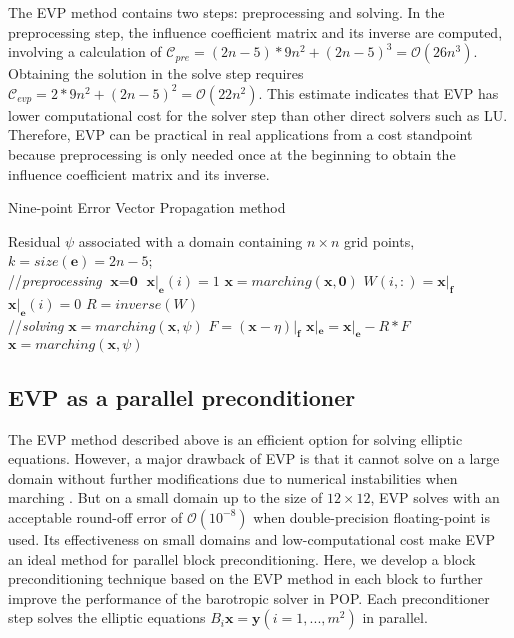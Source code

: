 The EVP method contains two steps: preprocessing and solving. In
the preprocessing step, the influence coefficient matrix and its
inverse are computed, involving a calculation of $\mathcal{C}_{pre}=
(2n-5)* 9n^2 + (2n-5)^3 = \mathcal {O} (26n^3)$.  Obtaining the solution in the solve step requires
$\mathcal{C}_{evp}= 2* 9n^2 + (2n-5)^2 = \mathcal{O} (22n^2)$.  This
estimate indicates that EVP has lower
computational cost for the solver step than other direct solvers such as
LU.
Therefore, EVP can be practical in real applications from a cost standpoint because
preprocessing is only needed once at the beginning to obtain the
influence coefficient matrix and its inverse.
\begin{algorithm}[t!]
\caption{Nine-point Error Vector Propagation method}
\label{alg:evp}
\begin{scriptsize}
\begin{algorithmic}[1]
\REQUIRE Residual $\psi$ associated with a domain containing $n\times n$ grid points, $k = size(\textbf{e})=2n-5$; \\
//\qquad \textit{preprocessing }
\STATE  $\textbf{x} = \textbf{0}$
\STATE $\textbf{x}|_\textbf{e}(i) = 1$
\STATE $\textbf{x} = marching(\textbf{x},\textbf{0})$
\STATE $W(i,:) = \textbf{x}|_\textbf{f}$
\STATE $\textbf{x}|_\textbf{e}(i) = 0$
\ENDFOR
\STATE $R = inverse(W)$ \\
//\qquad \textit{solving }
\STATE $\textbf{x}= marching(\textbf{x},\psi)$
\STATE $F = (\textbf{x} - \eta)|_\textbf{f}$
\STATE $\textbf{x}|_\textbf{e} =\textbf{x}|_\textbf{e} - R*F$
\STATE $\textbf{x} = marching(\textbf{x},\psi)$
\end{algorithmic}
\end{scriptsize}
\end{algorithm}

\subsection{EVP as a parallel preconditioner}
The EVP method described above is an efficient option for
solving elliptic equations.  However, a major drawback of
EVP is that it cannot solve on a large domain without further
modifications due to numerical instabilities when marching
\cite{roache1995elliptic}.  But on a small domain up to the size of
$12\times 12$, EVP solves with an acceptable round-off error of
$\mathcal{O}(10^{-8})$ when double-precision floating-point is used.  Its
effectiveness on small domains and low-computational cost make EVP an
ideal method for parallel block preconditioning.
Here, we develop a block preconditioning technique based on the EVP
method in each block to further improve the performance of the
barotropic solver in POP.  Each preconditioner step solves the
elliptic equations $B_i \textbf{x} = \textbf{y} (i=1,...,m^2)$ in
parallel.


